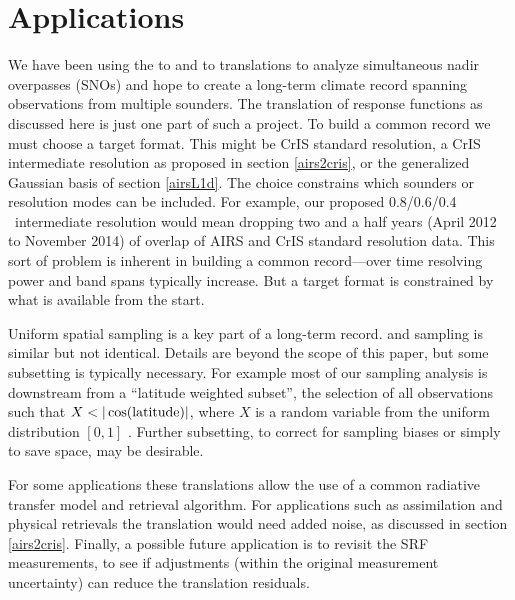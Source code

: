 \documentclass[journal]{IEEEtran}
\begin{document}
\section{Applications}  
\label{appcon}

We have been using the {\airs} to {\cris} and {\iasi} to {\cris}
translations to analyze simultaneous nadir overpasses (SNOs)
\cite{wang2015, sno1} and hope to create a long-term climate record
spanning observations from multiple sounders.  The translation of
response functions as discussed here is just one part of such a
project.  To build a common record we must choose a target format.
This might be CrIS standard resolution, a CrIS intermediate
resolution as proposed in section \ref{airs2cris}, or the
generalized Gaussian basis of section \ref{airsL1d}.  The choice
constrains which sounders or resolution modes can be included.  For
example, our proposed {\cris} 0.8/0.6/0.4 \wn\ intermediate
resolution would mean dropping two and a half years (April 2012 to
November 2014) of overlap of AIRS and CrIS standard resolution data.
This sort of problem is inherent in building a common record---over
time resolving power and band spans typically increase.  But a
target format is constrained by what is available from the start.

Uniform spatial sampling is a key part of a long-term record.
{\airs} and {\cris} sampling is similar but not identical.  Details
are beyond the scope of this paper, but some subsetting is typically
necessary.  For example most of our sampling analysis is downstream
from a ``latitude weighted subset'', the selection of all
observations such that $X < |\cos(\hbox{latitude})|$, where $X$ is a
random variable from the uniform distribution $[0, 1]$
\cite{git:acsamp}.  Further subsetting, to correct for sampling
biases or simply to save space, may be desirable.

For some applications these translations allow the use of a common
radiative transfer model and retrieval algorithm.  For applications
such as assimilation and physical retrievals the translation would
need added noise, as discussed in section \ref{airs2cris}.  Finally,
a possible future application is to revisit the {\airs} SRF
measurements, to see if adjustments (within the original measurement
uncertainty) can reduce the translation residuals.

\end{document}
